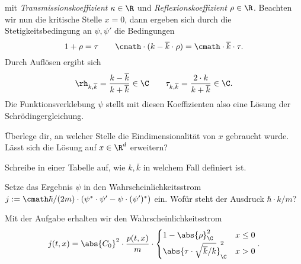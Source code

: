 \documentclass{subfiles}
\begin{document}
        mit \emph{Transmissionskoeffizient} $\kappa\in\R$ und \emph{Reflexionskoeffizient} $\rho\in\R$. Beachten wir nun die kritische Stelle $x=0$, dann ergeben sich durch die Stetigkeitsbedingung an $\psi,\psi'$ die Bedingungen
        \[1+\rho = \tau\qquad \cmath\cdot (k-\overline k\cdot\rho) = \cmath\cdot\overline k\cdot\tau.\]
        Durch Auflösen ergibt sich 
        \[\rh_{k,\overline k} = \frac{k - \overline k}{k + \overline k}\in\C\qquad \tau_{k,\overline k} = \frac{2\cdot k}{k+\overline k}\in\C.\]
        Die Funktionsverklebung $\psi$ stellt mit diesen Koeffizienten also eine Lösung der Schrödingergleichung. 

        \begin{Aufgabe}
            \nr{} Überlege dir, an welcher Stelle die Eindimensionalität von $x$ gebraucht wurde. Lässt sich die Lösung auf $x\in\R^d$ erweitern?

            \nr{} Schreibe in einer Tabelle auf, wie $k,\overline k$ in welchem Fall definiert ist. 

            \nr{} Setze das Ergebnis $\psi$ in den Wahrscheinlichkeitsstrom $j:=\cmath\hbar/(2m)\cdot(\psi^*\cdot\psi'-\psi\cdot(\psi')^*)$ ein. Wofür steht der Ausdruck $\hbar\cdot k/m$?
        \end{Aufgabe}
        Mit der Aufgabe erhalten wir den Wahrscheinlichkeitsstrom
        \[j(t,x) = \abs{C_0}^2\cdot \frac{p(t,x)}{m}\cdot\begin{cases}
            1-\abs{\rho}_\C^2 & x \leq 0 \\
            \abs{\tau\cdot \sqrt{\overline k/k}}_\C^2 & x > 0
        \end{cases}.\]
        
\end{document}
